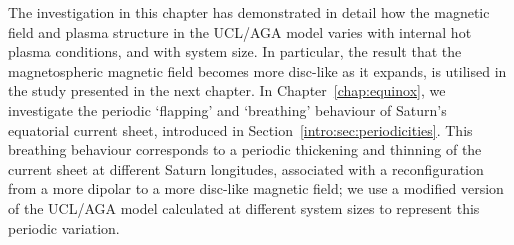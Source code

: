 The investigation in  this chapter has demonstrated in detail how the magnetic field and plasma structure in the UCL/AGA model varies with internal hot plasma conditions, and with system size. In particular, the result that the magnetospheric magnetic field becomes more disc-like as it expands, is utilised in the study presented in the next chapter. In Chapter~\ref{chap:equinox}, we investigate the periodic `flapping' and `breathing' behaviour of Saturn's equatorial current sheet, introduced in Section~\ref{intro:sec:periodicities}.  This breathing behaviour  corresponds to a periodic thickening and thinning of the current sheet at different Saturn  longitudes, associated with a reconfiguration from a more dipolar to a more disc-like magnetic field; we use a modified version of the UCL/AGA model calculated at different system sizes to represent this periodic variation.